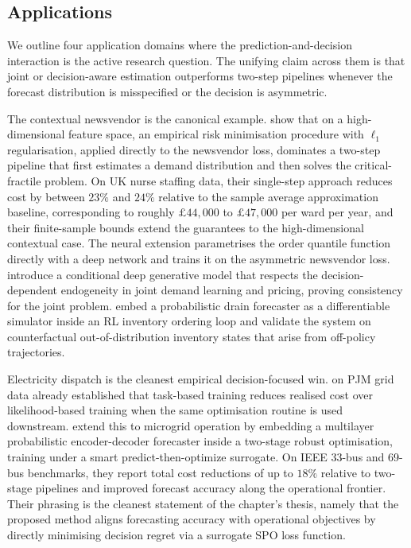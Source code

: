 \subsection{Applications}
\label{sec:forecasting_rl_applications}

We outline four application domains where the prediction-and-decision interaction
is the active research question. The unifying claim across them is that joint or
decision-aware estimation outperforms two-step pipelines whenever the forecast
distribution is misspecified or the decision is asymmetric.

The contextual newsvendor is the canonical example. \citet{BanRudin2019} show that
on a high-dimensional feature space, an empirical risk minimisation procedure with
$\ell_1$ regularisation, applied directly to the newsvendor loss, dominates a
two-step pipeline that first estimates a demand distribution and then solves the
critical-fractile problem. On UK nurse staffing data, their single-step approach
reduces cost by between $23\%$ and $24\%$ relative to the sample average
approximation baseline, corresponding to roughly $\pounds 44{,}000$ to
$\pounds 47{,}000$ per ward per year, and their finite-sample bounds extend the
\citet{Levi2007} guarantees to the high-dimensional contextual case. The
\citet{Oroojlooyjadid2020} neural extension parametrises the order quantile
function directly with a deep network and trains it on the asymmetric newsvendor
loss. \citet{HanZhengMisra2024} introduce a conditional deep generative model that
respects the decision-dependent endogeneity in joint demand learning and pricing,
proving consistency for the joint problem. \citet{Amazon2025} embed a probabilistic
drain forecaster as a differentiable simulator inside an RL inventory ordering
loop and validate the system on counterfactual out-of-distribution inventory
states that arise from off-policy trajectories.

Electricity dispatch is the cleanest empirical decision-focused win.
\citet{DontiAmosKolter2017} on PJM grid data already established that task-based
training reduces realised cost over likelihood-based training when the same
optimisation routine is used downstream. \citet{CaoXu2025} extend this to microgrid
operation by embedding a multilayer probabilistic encoder-decoder forecaster
inside a two-stage robust optimisation, training under a smart predict-then-optimize
surrogate. On IEEE 33-bus and 69-bus benchmarks, they report total cost reductions
of up to $18\%$ relative to two-stage pipelines and improved forecast accuracy
along the operational frontier. Their phrasing is the cleanest statement of the
chapter's thesis, namely that the proposed method aligns forecasting accuracy
with operational objectives by directly minimising decision regret via a surrogate
SPO loss function.

